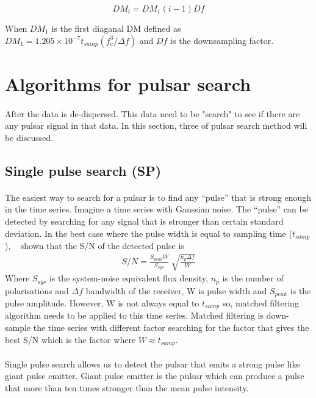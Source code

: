 \documentclass[thesis_msc.tex]{subfiles}
\begin{document}
                \begin{equation} \label{dm_step_dig}
        DM_i=DM_{1}(i-1) Df 
        \end{equation}        
         
               When $DM_{1}$ is the first diaganal DM defined as $DM_1 = 1.205\times10^{-7} t_{samp}(f_c^3/\Delta f)$  and $Df$ is the downsampling factor. 

        
    \section{Algorithms for pulsar search}
    \paragraph{} After the data is de-dispersed. This data need to be "search" to see if there are any pulsar signal in that data. In this section, three of pulsar search method will be discussed.   
        	\subsection{Single pulse search (SP)} \label{SP}
        \paragraph{} The easiest way to search for a pulsar is to find any ``pulse'' that is strong enough in the time series. Imagine a time series with Gaussian noise. The ``pulse'' can be detected by searching for any signal that is stronger than certain standard deviation. In the best case where the pulse width is equal to sampling time ($t_{samp}$), ~\cite{cordes2003searches} shown that the S/N of the detected pulse is 
\begin{eqnarray}
S/N=\frac{S_{peak} W}{S_{sys}}\sqrt[]{\frac{n_p \Delta f}{W}}
\end{eqnarray}
Where $S_{sys}$ is the system-noise equivalent flux density, $n_p$ is the number of polarisations and $\Delta f$ bandwidth of the receiver, W is pulse width and $S_{peak}$ is the pulse amplitude. However, W is not always equal to $t_{samp}$ so, matched filtering algorithm needs to be applied to this time series. Matched filtering is down-sample the time series with different factor searching for the factor that gives the best S/N which is the factor where $W \approx t_{samp}$.

\paragraph{} Single pulse search allows us to detect the pulsar that emits a strong pulse like giant pulse emitter. Giant pulse emitter is the pulsar which can produce a pulse that more than ten times stronger than the mean pulse intensity. 
\end{document}
